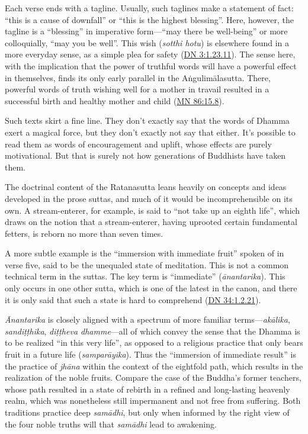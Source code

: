 \documentclass[12pt,openany]{book}%
\begin{document}
Each verse ends with a tagline. Usually, such taglines make a statement of fact: “this is a cause of downfall” or “this is the highest blessing”. Here, however, the tagline is a “blessing” in imperative form—“may there be well-being” or more colloquially, “may you be well”. This wish (\textit{sotthi hotu}) is elsewhere found in a more everyday sense, as a simple plea for safety (\href{https://suttacentral.net/dn3/en/sujato\#1.23.11}{DN 3:1.23.11}). The sense here, with the implication that the power of truthful words will have a powerful effect in themselves, finds its only early parallel in the \textsanskrit{Aṅgulimālasutta}. There, powerful words of truth wishing well for a mother in travail resulted in a successful birth and healthy mother and child (\href{https://suttacentral.net/mn86/en/sujato\#15.8}{MN 86:15.8}).

Such texts skirt a fine line. They don’t exactly say that the words of Dhamma exert a magical force, but they don’t exactly not say that either. It’s possible to read them as words of encouragement and uplift, whose effects are purely motivational. But that is surely not how generations of Buddhists have taken them.

The doctrinal content of the Ratanasutta leans heavily on concepts and ideas developed in the prose suttas, and much of it would be incomprehensible on its own. A stream-enterer, for example, is said to “not take up an eighth life”, which draws on the notion that a stream-enterer, having uprooted certain fundamental fetters, is reborn no more than seven times.

A more subtle example is the “immersion with immediate fruit” spoken of in verse five, said to be the unequaled state of meditation. This is not a common technical term in the suttas. The key term is “immediate” (\textit{\textsanskrit{ānantarika}}). This only occurs in one other sutta, which is one of the latest in the canon, and there it is only said that such a state is hard to comprehend (\href{https://suttacentral.net/dn34/en/sujato\#1.2.21}{DN 34:1.2.21}).

\textit{Ānantarika} is closely aligned with a spectrum of more familiar terms—\textit{\textsanskrit{akālika}}, \textit{\textsanskrit{sandiṭṭhika}}, \textit{\textsanskrit{diṭṭheva} dhamme}—all of which convey the sense that the Dhamma is to be realized “in this very life”, as opposed to a religious practice that only bears fruit in a future life (\textit{\textsanskrit{samparāyika}}). Thus the “immersion of immediate result” is the practice of \textit{\textsanskrit{jhāna}} within the context of the eightfold path, which results in the realization of the noble fruits. Compare the case of the Buddha’s former teachers, whose path resulted in a state of rebirth in a refined and long-lasting heavenly realm, which was nonetheless still impermanent and not free from suffering. Both traditions practice deep \textit{\textsanskrit{samādhi}}, but only when informed by the right view of the four noble truths will that \textit{\textsanskrit{samādhi}} lead to awakening.
\end{document}
